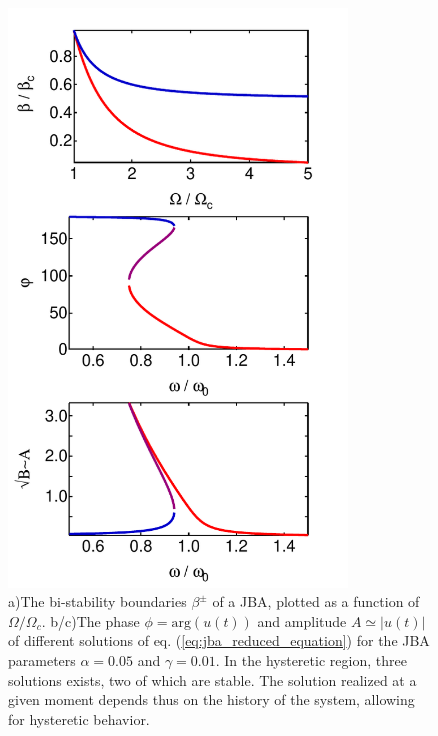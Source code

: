 \begin{figure}
	\includegraphics[width=9cm]{"./material/mathematica/jba_curves"}
	\caption{a)The bi-stability boundaries $\beta^\pm$ of a JBA, plotted as a function of $\Omega/\Omega_c$. b/c)The phase $\phi=\mathrm{arg}(u(t))$ and amplitude $A\simeq |u(t)|$ of different solutions of eq. (\ref{eq:jba_reduced_equation}) for the JBA parameters $\alpha=0.05$ and $\gamma=0.01$. In the hysteretic region, three solutions exists, two of which are stable. The solution realized at a given moment depends thus on the history of the system, allowing for hysteretic behavior.}
	\label{fig:jba_curves}
\end{figure}
